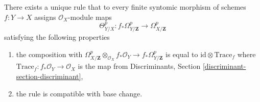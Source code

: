 \begin{lemma}
\label{lemma-Garel}
There exists a unique rule that to every finite syntomic
morphism of schemes $f : Y \to X$ assigns $\mathcal{O}_X$-module maps
$$
\Theta^p_{Y/X} :
f_*\Omega^p_{Y/\mathbf{Z}}
\longrightarrow
\Omega^p_{X/\mathbf{Z}}
$$
satisfying the following properties
\begin{enumerate}
\item the composition with
$\Omega^p_{X/\mathbf{Z}} \otimes_{\mathcal{O}_X} f_*\mathcal{O}_Y
\to f_*\Omega^p_{Y/\mathbf{Z}}$ is equal to
$\text{id} \otimes \text{Trace}_f$
where $\text{Trace}_f : f_*\mathcal{O}_Y \to \mathcal{O}_X$
is the map from
Discriminants, Section \ref{discriminant-section-discriminant},
\item the rule is compatible with base change.
\end{enumerate}
\end{lemma}

